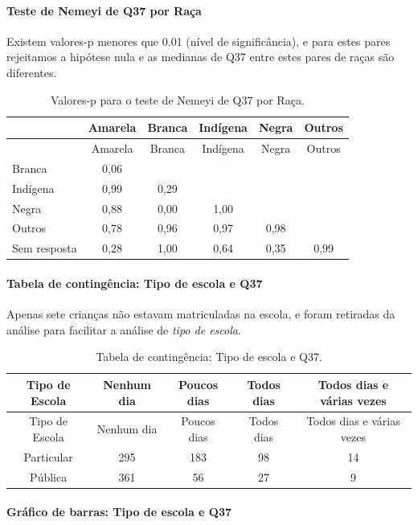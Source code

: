\documentclass[]{article}
\let\oldparagraph\paragraph
\renewcommand{\paragraph}[1]{\oldparagraph{#1}\mbox{}}
\begin{document}
\hypertarget{teste-de-nemeyi-de-q37-por-rauxe7a}{%
\paragraph{Teste de Nemeyi de Q37 por Raça}\label{teste-de-nemeyi-de-q37-por-rauxe7a}}

Existem valores-p menores que 0.01 (nível de significância), e para estes pares rejeitamos a hipótese nula e as medianas de Q37 entre estes pares de raças são diferentes.

\begin{longtable}[]{@{}lccccc@{}}
\caption{\label{tab:unnamed-chunk-1409}Valores-p para o teste de Nemeyi de Q37 por Raça.}\tabularnewline
\toprule
& Amarela & Branca & Indígena & Negra & Outros\tabularnewline
\midrule
\endfirsthead
\toprule
& Amarela & Branca & Indígena & Negra & Outros\tabularnewline
\midrule
\endhead
Branca & 0,06 & & & &\tabularnewline
Indígena & 0,99 & 0,29 & & &\tabularnewline
Negra & 0,88 & 0,00 & 1,00 & &\tabularnewline
Outros & 0,78 & 0,96 & 0,97 & 0,98 &\tabularnewline
Sem resposta & 0,28 & 1,00 & 0,64 & 0,35 & 0,99\tabularnewline
\bottomrule
\end{longtable}

\cleardoublepage

\hypertarget{tabela-de-continguxeancia-tipo-de-escola-e-q37}{%
\paragraph{Tabela de contingência: Tipo de escola e Q37}\label{tabela-de-continguxeancia-tipo-de-escola-e-q37}}

Apenas sete crianças não estavam matriculadas na escola, e foram retiradas da análise para facilitar a análise de \emph{tipo de escola}.

\begin{longtable}[]{@{}ccccc@{}}
\caption{\label{tab:unnamed-chunk-1410}Tabela de contingência: Tipo de escola e Q37.}\tabularnewline
\toprule
Tipo de Escola & Nenhum dia & Poucos dias & Todos dias & Todos dias e várias vezes\tabularnewline
\midrule
\endfirsthead
\toprule
Tipo de Escola & Nenhum dia & Poucos dias & Todos dias & Todos dias e várias vezes\tabularnewline
\midrule
\endhead
Particular & 295 & 183 & 98 & 14\tabularnewline
Pública & 361 & 56 & 27 & 9\tabularnewline
\bottomrule
\end{longtable}

\hypertarget{gruxe1fico-de-barras-tipo-de-escola-e-q37}{%
\paragraph{Gráfico de barras: Tipo de escola e Q37}\label{gruxe1fico-de-barras-tipo-de-escola-e-q37}}
\end{document}
